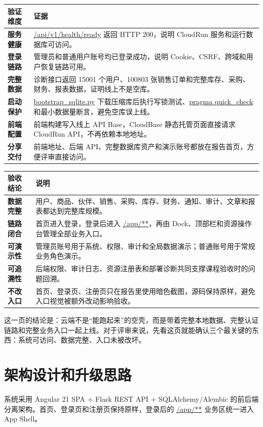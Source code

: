 \documentclass[UTF8,zihao=-4]{ctexart}
\newcommand{\code}[1]{{\small\url{#1}}}
\begin{document}
\vspace{0.5em}
\begin{tabularx}{\textwidth}{>{\bfseries}p{}X}
\toprule
验证维度 & 证据 \\
\midrule
服务健康 & \code{/api/v1/health/ready} 返回 HTTP 200，说明 CloudRun 服务和运行数据库可访问。 \\
登录链路 & 管理员和普通用户账号均已登录成功，说明 Cookie、CSRF、跨域和用户恢复链路可用。 \\
完整数据 & 诊断接口返回 15001 个用户、100803 张销售订单和完整库存、采购、财务、报表数据，证明线上不是空库。 \\
启动保护 & \code{bootstrap_sqlite.py} 下载压缩库后执行写锁测试、\code{pragma quick_check} 和最小数据量断言，避免空库误上线。 \\
前端配置 & 前端构建写入线上 API Base，CloudBase 静态托管页面直接请求 CloudRun API，不再依赖本地地址。 \\
分享交付 & 前端地址、后端 API、完整数据库资产和演示账号都放在报告首页，方便评审直接访问。 \\
\bottomrule
\end{tabularx}
\vspace{0.65em}
\begin{tabularx}{\textwidth}{>{\bfseries}p{}X}
\toprule
验收结论 & 说明 \\
\midrule
数据完整 & 用户、商品、伙伴、销售、采购、库存、财务、通知、审计、文章和报表都达到完整库规模。 \\
链路闭合 & 首页进入登录，登录后进入 \code{/app/**}，再由 Dock、顶部栏和资源操作台管理全部业务入口。 \\
可演示性 & 管理员账号用于系统、权限、审计和全局数据演示；普通账号用于常规业务角色演示。 \\
可追溯性 & 后端权限、审计日志、资源注册表和部署诊断共同支撑课程验收时的问题回溯。 \\
不改入口 & 首页、登录页、注册页只在报告里使用暗色截图，源码保持原样，避免入口视觉被额外改动影响验收。 \\
\bottomrule
\end{tabularx}

这一页的结论是：云端不是“能跑起来”的空壳，而是带着完整本地数据、完整认证链路和完整业务入口一起上线。对于评审来说，先看这页就能确认三个最关键的东西：系统可访问、数据完整、入口未被改坏。
\vspace{0.35em}
\clearpage
\section{架构设计和升级思路}
系统采用 Angular 21 SPA + Flask REST API + SQLAlchemy/Alembic 的前后端分离架构。首页、登录页和注册页保持原样，登录后的 \code{/app/**} 业务区统一进入 App Shell。
\end{document}
